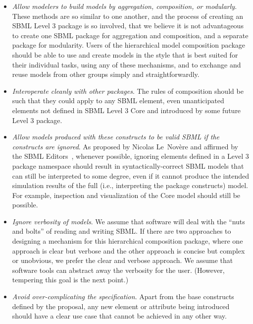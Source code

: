 \begin{itemize}

\item \emph{Allow modelers to build models by aggregation, composition,
    or modularly}.  These methods are so similar to one another, and the
  process of creating an SBML Level 3 package is so involved, that we
  believe it is not advantageous to create one SBML package for
  aggregation and composition, and a separate package for modularity.
  Users of the hierarchical model composition package should be able to
  use and create models in the style that is best suited for their
  individual tasks, using any of these mechanisms, and to exchange and
  reuse models from other groups simply and straightforwardly.

\item \emph{Interoperate cleanly with other packages}. The rules of
  composition should be such that they could apply to any SBML element,
  even unanticipated elements not defined in SBML Level 3 Core and
  introduced by some future Level 3 package.

\item \emph{Allow models produced with these constructs to be valid SBML
    if the constructs are ignored}.  As proposed by Nicolas
  Le~Nov\`{e}re and affirmed by the SBML Editors~\cite{}, whenever
  possible, ignoring elements defined in a Level 3 package namespace
  should result in syntactically-correct SBML models that can still be
  interpreted to some degree, even if it cannot produce the intended
  simulation results of the full (i.e., interpreting the package
  constructs) model.  For example, inspection and visualization of the
  Core model should still be possible.

\item \emph{Ignore verbosity of models}. We assume that software will
  deal with the ``nuts and bolts'' of reading and writing SBML.  If
  there are two approaches to designing a mechanism for this
  hierarchical composition package, where one approach is clear but
  verbose and the other approach is concise but complex or unobvious, we
  prefer the clear and verbose approach.  We assume that software tools
  can abstract away the verbosity for the user.  (However, tempering
  this goal is the next point.)

\item \emph{Avoid over-complicating the specification}. Apart from the
  base constructs defined by the proposal, any new element or attribute
  being introduced should have a clear use case that cannot be achieved
  in any other way.  


\end{itemize}
